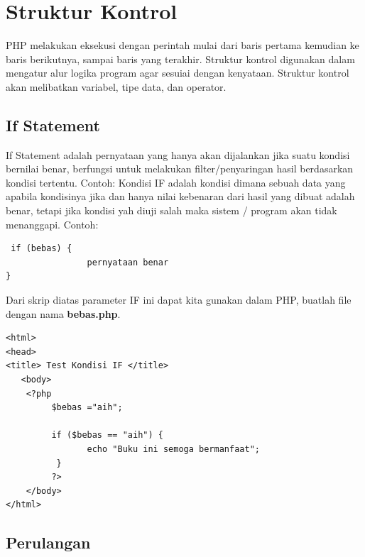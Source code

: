 \section{Struktur Kontrol}
PHP melakukan eksekusi dengan perintah mulai dari baris pertama kemudian ke baris berikutnya, sampai baris yang terakhir. Struktur kontrol digunakan dalam mengatur alur logika program agar sesuiai dengan kenyataan. Struktur kontrol akan melibatkan variabel, tipe data, dan operator. 
\subsection{If Statement}
If Statement  adalah pernyataan yang hanya akan dijalankan jika suatu kondisi bernilai benar, berfungsi untuk melakukan filter/penyaringan hasil berdasarkan kondisi tertentu. Contoh:
Kondisi IF adalah kondisi dimana sebuah data yang apabila kondisinya jika dan hanya nilai kebenaran dari hasil yang dibuat adalah benar, tetapi jika kondisi yah diuji salah maka sistem / program akan tidak menanggapi. Contoh:
\begin{lstlisting}
 if (bebas) {
                pernyataan benar
}
\end{lstlisting}
Dari skrip diatas parameter IF ini dapat kita gunakan dalam PHP, buatlah file dengan nama \textbf{bebas.php}.
\begin{lstlisting}
<html>
<head>
<title> Test Kondisi IF </title>
   <body>
    <?php
         $bebas ="aih";

         if ($bebas == "aih") {
                echo "Buku ini semoga bermanfaat";
          }
         ?>
    </body>
</html>
\end{lstlisting}

\subsection{Perulangan}
